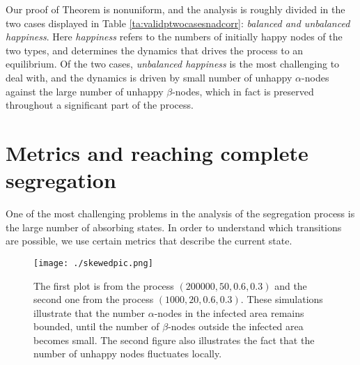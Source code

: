 \documentclass[11pt]{article}
\theoremstyle{plain}
\numberwithin{equation}{subsection}
\begin{document}
Our proof of Theorem 
is nonuniform, and the analysis is roughly divided in the two cases displayed in Table \ref{ta:validptwocasesnadcorr}:
{\em balanced and unbalanced happiness}. Here {\em happiness} refers to the numbers of initially happy nodes of the
two types, and determines the dynamics that drives the process to an equilibrium. Of the two cases, 
{\em unbalanced happiness} is the most challenging to deal with, and the dynamics is driven by small number of unhappy
$\alpha$-nodes against the large number of unhappy $\beta$-nodes, which in fact is preserved throughout a significant part of the process.
 

\section{Metrics and reaching complete segregation}\label{se:analyticsche}
One of the most challenging problems in the analysis of the segregation process
is the large number of absorbing states. In order to understand which transitions are possible,
we use certain metrics that 
describe the current state.


\begin{figure}
\texttt{[image: ./skewedpic.png]}
\centering
 \caption{The first plot is
from the process $(200000, 50, 0.6, 0.3)$
and the second one 
from the process $(1000, 20, 0.6, 0.3)$.
These simulations illustrate that the number $\alpha$-nodes in the infected area remains bounded, until
the number of $\beta$-nodes outside the infected area becomes small. The second figure also illustrates
the fact that the number of unhappy nodes fluctuates locally.}\label{fig:inf_area}
\end{figure}  
\end{document}
